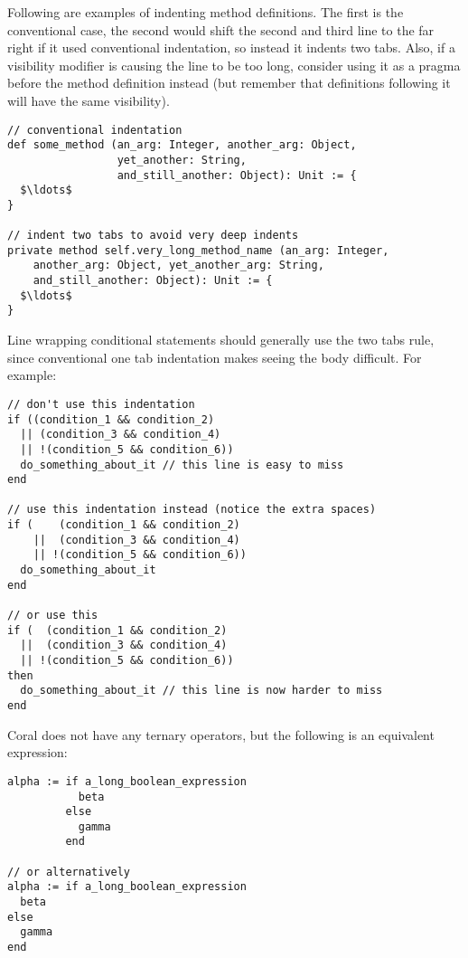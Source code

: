 \example Following are examples of indenting method definitions. The first is the conventional case, the second would shift the second and third line to the far right if it used conventional indentation, so instead it indents two tabs. Also, if a visibility modifier is causing the line to be too long, consider using it as a pragma before the method definition instead (but remember that definitions following it will have the same visibility). 

\begin{lstlisting}
// conventional indentation
def some_method (an_arg: Integer, another_arg: Object, 
                 yet_another: String,
                 and_still_another: Object): Unit := {
  $\ldots$
}

// indent two tabs to avoid very deep indents
private method self.very_long_method_name (an_arg: Integer,
    another_arg: Object, yet_another_arg: String, 
    and_still_another: Object): Unit := {
  $\ldots$
}
\end{lstlisting}

\example Line wrapping conditional statements should generally use the two tabs rule, since conventional one tab indentation makes seeing the body difficult. For example: 

\begin{lstlisting}
// don't use this indentation
if ((condition_1 && condition_2)
  || (condition_3 && condition_4)
  || !(condition_5 && condition_6))
  do_something_about_it // this line is easy to miss
end

// use this indentation instead (notice the extra spaces)
if (    (condition_1 && condition_2)
    ||  (condition_3 && condition_4)
    || !(condition_5 && condition_6))
  do_something_about_it
end

// or use this
if (  (condition_1 && condition_2)
  ||  (condition_3 && condition_4)
  || !(condition_5 && condition_6))
then
  do_something_about_it // this line is now harder to miss
end
\end{lstlisting}

\example Coral does not have any ternary operators, but the following is an equivalent expression:

\begin{lstlisting}
alpha := if a_long_boolean_expression
           beta
         else
           gamma
         end

// or alternatively
alpha := if a_long_boolean_expression
  beta
else
  gamma
end
\end{lstlisting}





